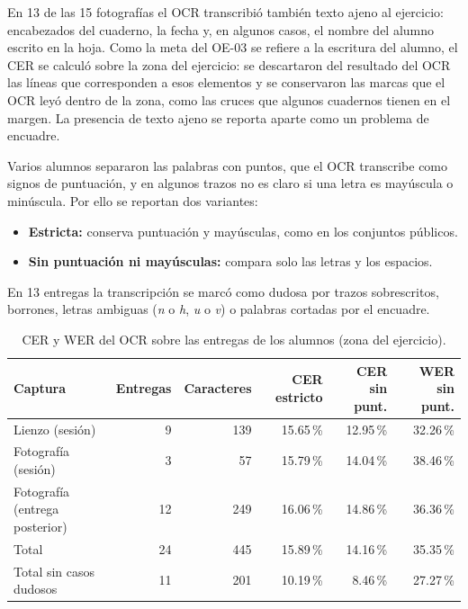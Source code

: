 En 13 de las 15 fotografías el OCR transcribió también texto ajeno al ejercicio: encabezados del cuaderno, la fecha y, en algunos casos, el nombre del alumno escrito en la hoja. Como la meta del OE-03 se refiere a la escritura del alumno, el CER se calculó sobre la zona del ejercicio: se descartaron del resultado del OCR las líneas que corresponden a esos elementos y se conservaron las marcas que el OCR leyó dentro de la zona, como las cruces que algunos cuadernos tienen en el margen. La presencia de texto ajeno se reporta aparte como un problema de encuadre.

Varios alumnos separaron las palabras con puntos, que el OCR transcribe como signos de puntuación, y en algunos trazos no es claro si una letra es mayúscula o minúscula. Por ello se reportan dos variantes:
\begin{itemize}
    \item \textbf{Estricta:} conserva puntuación y mayúsculas, como en los conjuntos públicos.
    \item \textbf{Sin puntuación ni mayúsculas:} compara solo las letras y los espacios.
\end{itemize}
En 13 entregas la transcripción se marcó como dudosa por trazos sobrescritos, borrones, letras ambiguas (\textit{n} o \textit{h}, \textit{u} o \textit{v}) o palabras cortadas por el encuadre.

\begin{table}[htbp]
\centering
\caption{CER y WER del OCR sobre las entregas de los alumnos (zona del ejercicio).}
\label{tab:resultados-cer-alumnos}
\renewcommand{\arraystretch}{1.2}
\setlength{\tabcolsep}{3.5pt}
\begin{tabular}{@{}lrrrrr@{}}
\toprule
Captura & Entregas & Caracteres & CER estricto & CER sin punt. & WER sin punt. \\
\midrule
Lienzo (sesión) & 9 & 139 & 15.65\,\% & 12.95\,\% & 32.26\,\% \\
Fotografía (sesión) & 3 & 57 & 15.79\,\% & 14.04\,\% & 38.46\,\% \\
Fotografía (entrega posterior) & 12 & 249 & 16.06\,\% & 14.86\,\% & 36.36\,\% \\
\midrule
Total & 24 & 445 & 15.89\,\% & 14.16\,\% & 35.35\,\% \\
Total sin casos dudosos & 11 & 201 & 10.19\,\% & 8.46\,\% & 27.27\,\% \\
\bottomrule
\end{tabular}
\end{table}

